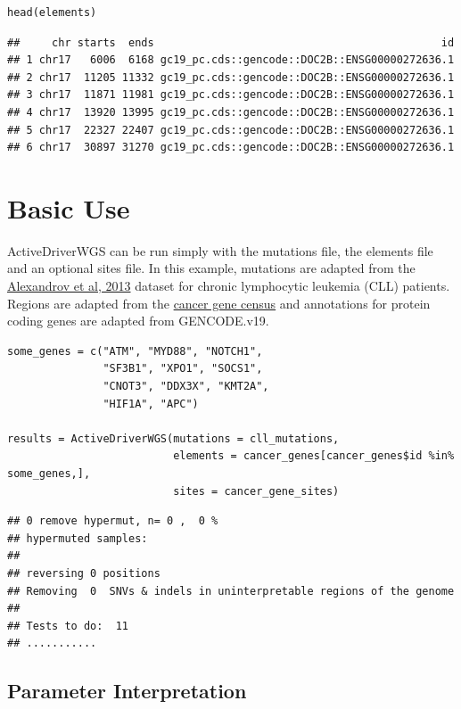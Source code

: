 \documentclass[]{article}
\begin{document}
\begin{verbatim}
head(elements)
\end{verbatim}

\begin{verbatim}
##     chr starts  ends                                             id
## 1 chr17   6006  6168 gc19_pc.cds::gencode::DOC2B::ENSG00000272636.1
## 2 chr17  11205 11332 gc19_pc.cds::gencode::DOC2B::ENSG00000272636.1
## 3 chr17  11871 11981 gc19_pc.cds::gencode::DOC2B::ENSG00000272636.1
## 4 chr17  13920 13995 gc19_pc.cds::gencode::DOC2B::ENSG00000272636.1
## 5 chr17  22327 22407 gc19_pc.cds::gencode::DOC2B::ENSG00000272636.1
## 6 chr17  30897 31270 gc19_pc.cds::gencode::DOC2B::ENSG00000272636.1
\end{verbatim}

\section{Basic Use}\label{basic-use}

ActiveDriverWGS can be run simply with the mutations file, the elements
file and an optional sites file. In this example, mutations are adapted
from the \href{https://www.nature.com/articles/nature12477}{Alexandrov
et al, 2013} dataset for chronic lymphocytic leukemia (CLL) patients.
Regions are adapted from the
\href{https://cancer.sanger.ac.uk/census}{cancer gene census} and
annotations for protein coding genes are adapted from GENCODE.v19.

\begin{verbatim}
some_genes = c("ATM", "MYD88", "NOTCH1",
               "SF3B1", "XPO1", "SOCS1", 
               "CNOT3", "DDX3X", "KMT2A", 
               "HIF1A", "APC")

results = ActiveDriverWGS(mutations = cll_mutations,
                          elements = cancer_genes[cancer_genes$id %in% some_genes,],
                          sites = cancer_gene_sites)
\end{verbatim}

\begin{verbatim}
## 0 remove hypermut, n= 0 ,  0 %
## hypermuted samples:   
## 
## reversing 0 positions
## Removing  0  SNVs & indels in uninterpretable regions of the genome 
## 
## Tests to do:  11 
## ...........
\end{verbatim}

\subsection{Parameter Interpretation}\label{parameter-interpretation}
\end{document}
